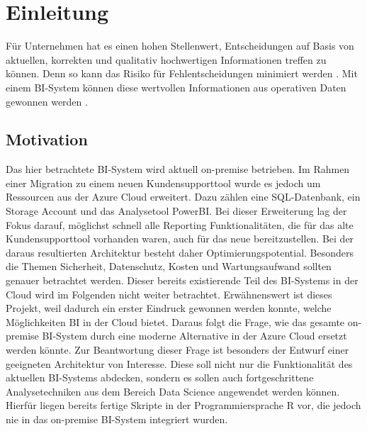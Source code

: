 \chapter{Einleitung}
\label{ch:intro}
Für Unternehmen hat es einen hohen Stellenwert, Entscheidungen auf Basis von aktuellen, korrekten und qualitativ hochwertigen Informationen treffen zu können. Denn so kann das Risiko für Fehlentscheidungen minimiert werden \cite{grunwald_business_2009}. Mit einem BI-System können diese wertvollen Informationen aus operativen Daten gewonnen werden \cite{muller_business_2013}.

\section{Motivation}
\label{sec:intro:motivation}
Das hier betrachtete BI-System wird aktuell on-premise betrieben. Im Rahmen einer Migration zu einem neuen Kundensupporttool wurde es jedoch um Ressourcen aus der Azure Cloud erweitert. Dazu zählen eine SQL-Datenbank, ein Storage Account und das Analysetool PowerBI. Bei dieser Erweiterung lag der Fokus darauf, möglichst schnell alle Reporting Funktionalitäten, die für das alte Kundensupporttool vorhanden waren, auch für das neue bereitzustellen. Bei der daraus resultierten Architektur besteht daher Optimierungspotential. Besonders die Themen Sicherheit, Datenschutz, Kosten und Wartungsaufwand sollten genauer betrachtet werden. Dieser bereits existierende Teil des BI-Systems in der Cloud wird im Folgenden nicht weiter betrachtet. Erwähnenswert ist dieses Projekt, weil dadurch ein erster Eindruck gewonnen werden konnte, welche Möglichkeiten BI in der Cloud bietet. Daraus folgt die Frage, wie das gesamte on-premise BI-System durch eine moderne Alternative in der Azure Cloud ersetzt werden könnte. Zur Beantwortung dieser Frage ist besonders der Entwurf einer geeigneten Architektur von Interesse. Diese soll nicht nur die Funktionalität des aktuellen BI-Systems abdecken, sondern es sollen auch fortgeschrittene Analysetechniken aus dem Bereich Data Science angewendet werden können. Hierfür liegen bereits fertige Skripte in der Programmiersprache R vor, die jedoch nie in das on-premise BI-System integriert wurden.


